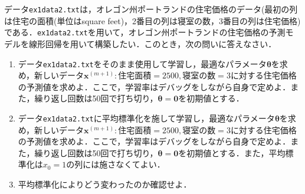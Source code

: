 \begin{qu}\label{qu_lr2_1}
データ\texttt{ex1data2.txt}は，オレゴン州ポートランドの住宅価格のデータ(最初の列は住宅の面積(単位はsquare feet)，2番目の列は寝室の数，3番目の列は住宅価格)である．\texttt{ex1data2.txt}を用いて，オレゴン州ポートランドの住宅価格の予測モデルを線形回帰を用いて構築したい．このとき，次の問いに答えなさい．
\begin{enumerate}
\item データ\texttt{ex1data2.txt}をそのまま使用して学習し，最適なパラメータ${\bm \theta}$を求め，新しいデータ${\bm x}^{(m+1)}:住宅面積=2500, 寝室の数=3$に対する住宅価格の予測値を求めよ．ここで，学習率はデバッグをしながら自身で定めよ．また，繰り返し回数は50回で打ち切り，${\bm \theta}={\bm 0}$を初期値とする．
\item データ\texttt{ex1data2.txt}に平均標準化を施して学習し，最適なパラメータ${\bm \theta}$を求め，新しいデータ${\bm x}^{(m+1)}:住宅面積=2500, 寝室の数=3$に対する住宅価格の予測値を求めよ．ここで，学習率はデバッグをしながら自身で定めよ．また，繰り返し回数は50回で打ち切り，${\bm \theta}={\bm 0}$を初期値とする．また，平均標準化は$x_0=1$の列には施さなくてよい．
\item 平均標準化によりどう変わったのか確認せよ．
\end{enumerate}
\end{qu}
